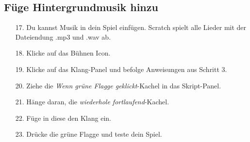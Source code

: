 \subsection{Füge Hintergrundmusik hinzu}
\begin{itemize}
\item[17.] Du kannst Musik in dein Spiel einfügen. Scratch spielt alle Lieder mit der Dateiendung .mp3 und .wav ab.
\item[18.] Klicke auf das Bühnen Icon.
\item[19.] Klicke auf das Klang-Panel und befolge Anweisungen aus Schritt 3.
\item[20.] Ziehe die \textit{Wenn grüne Flagge geklickt}-Kachel in das Skript-Panel.
\item[21.] Hänge daran, die \textit{wiederhole fortlaufend}-Kachel.
\item[22.] Füge in diese den Klang ein.
\item[23.] Drücke die grüne Flagge und teste dein Spiel.
\end{itemize}